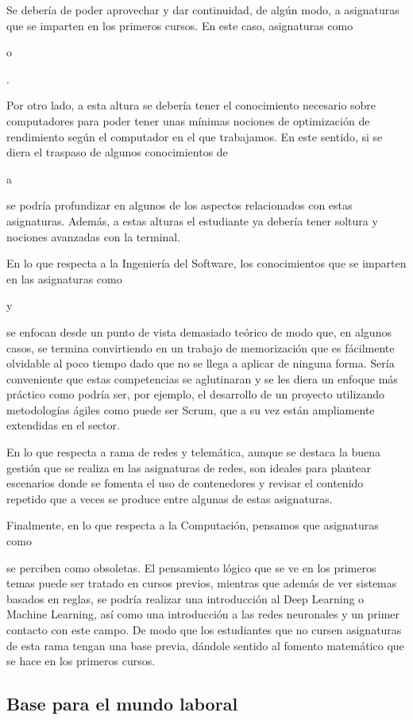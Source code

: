 Se debería de poder aprovechar y dar continuidad, de algún modo,
a asignaturas que se imparten en los primeros cursos.
En este caso, asignaturas como \subject{Estadística} o \subject{Bases de Datos}.

Por otro lado, a esta altura se debería tener
el conocimiento necesario sobre computadores para
poder tener unas mínimas nociones de optimización de rendimiento
según el computador en el que trabajamos.
En este sentido, si se diera el traspaso de algunos conocimientos de
\subject{Arquitectura y Organización de Computadores} a
\subject{Ampliación de Estructura de Computadores}
se podría profundizar en algunos de los aspectos
relacionados con estas asignaturas.
Además, a estas alturas el estudiante ya debería tener
soltura y nociones avanzadas con la terminal.

En lo que respecta a la Ingeniería del Software,
los conocimientos que se imparten en las asignaturas como
\subject{Procesos de Desarrollo Software} y
\subject{Gestión de Proyectos de Desarrollo de Software}
se enfocan desde un punto de vista demasiado teórico de modo que,
en algunos casos,
se termina convirtiendo en un trabajo de memorización que
es fácilmente olvidable al poco tiempo
dado que no se llega a aplicar de ninguna forma.
Sería conveniente que estas competencias se aglutinaran y
se les diera un enfoque más práctico como podría ser, por ejemplo,
el desarrollo de un proyecto utilizando
metodologías ágiles como puede ser Scrum,
que a su vez están ampliamente extendidas en el sector.

En lo que respecta a rama de redes y telemática,
aunque se destaca la buena gestión que se realiza en las asignaturas de redes,
son ideales para plantear escenarios donde se fomenta el uso de contenedores y
revisar el contenido repetido que
a veces se produce entre algunas de estas asignaturas.

Finalmente, en lo que respecta a la Computación,
pensamos que asignaturas como \subject{Sistemas inteligentes}
se perciben como obsoletas.
El pensamiento lógico que se ve en los primeros temas
puede ser tratado en cursos previos,
mientras que además de ver sistemas basados en reglas,
se podría realizar una introducción al Deep Learning o Machine Learning,
así como una introducción a las redes neuronales y
un primer contacto con este campo.
De modo que los estudiantes que no cursen asignaturas de esta rama
tengan una base previa,
dándole sentido al fomento matemático que se hace en los primeros cursos.


\subsection{Base para el mundo laboral}

